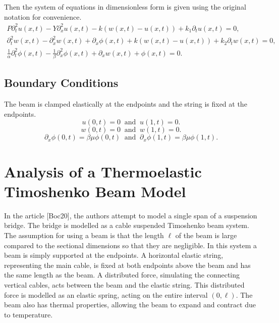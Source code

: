 \documentclass[../../main.tex]{subfiles}
\begin{document}
Then the system of equations in dimensionless form is given using the original notation for convenience. 
\begin{eqnarray}
P \partial^2_{t} u(x,t) - Y\partial^2_x u(x,t) - k(w(x,t) - u(x,t))+ k_1 \partial_t u(x,t) = 0, \\
\partial^2_{t}w(x,t) - \partial^2_x w(x,t) + \partial_x\phi(x,t) + k(w(x,t)-u(x,t)) + k_2\partial_t w(x,t) = 0,\\
\frac{1}{\alpha} \partial^2_{t}\phi(x,t) - \frac{1}{\beta} \partial^2_{x} \phi(x,t) + \partial_x w(x,t) + \phi(x,t) = 0. 
\end{eqnarray}

\subsection{Boundary Conditions}
The beam is clamped elastically at the endpoints and the string is fixed at the endpoints.
\[u(0,t) = 0 \ \text{ and } \ u(1,t) = 0.\]
\[w(0,t) = 0 \ \text{ and } \ w(1,t) = 0.\]
\[\partial_x \phi(0,t) = \beta \mu\phi(0,t) \ \text{ and } \ \partial_x \phi(1,t)= \beta\mu\phi(1,t).\]

\section{Analysis of a Thermoelastic Timoshenko Beam Model}
In the article [Boc20], the authors attempt to model a single span of a suspension bridge. The bridge is modelled as a cable suspended Timoshenko beam system. The assumption for using a beam is that the length $\ell$ of the beam is large compared to the sectional dimensions so that they are negligible. In this system a beam is simply supported at the endpoints. A horizontal elastic string, representing  the main cable, is fixed at both endpoints above the beam and has the same length as the beam. A distributed force, simulating the connecting vertical cables, acts between the beam and the elastic string. This distributed force is modelled as an elastic spring, acting on the entire interval $(0,\ell)$. The beam also has thermal properties, allowing the beam to expand and contract due to temperature.\\
\end{document}

